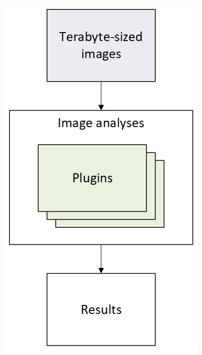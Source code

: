 \begin{frame}
\begin{minipage}[h!]{0.35\textwidth}
    \includegraphics[scale=0.55]{./img/1_background/wipp.png}
  \end{minipage}
\end{frame}

\def\slidetitle{Plugin concept}

